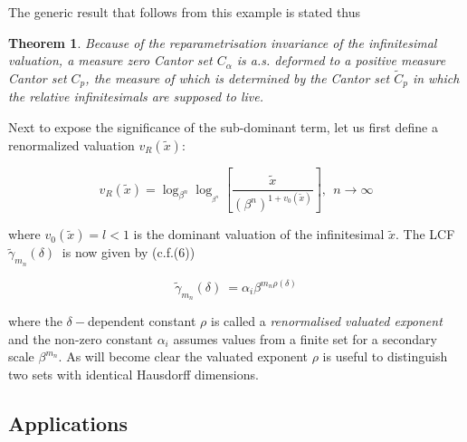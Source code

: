 \documentclass[12pt]{article}
\newtheorem{theorem}{Theorem}
\begin{document}
\vspace{.25cm}

The generic result that follows from this example is stated thus

\begin{theorem}
Because of the reparametrisation invariance of the infinitesimal valuation, a measure zero Cantor set $C_{\alpha}$ is a.s. deformed to a positive measure Cantor set $C_p$, the measure of which is determined by the Cantor set $\tilde C_p$ in which the relative infinitesimals are supposed to live. 
\end{theorem}

Next to expose the significance of the sub-dominant term, let us first define a
renormalized valuation $v_R(\tilde x)$:

\begin{equation}\label{eq32}
v_{R}\left( \tilde{x}\right) =\log _{\beta ^{n}}\log _{_{\beta ^{n}}}\left[ 
\frac{\tilde{x}}{\left( {\beta ^{n}}\right) ^{1+v_{0}\left( \tilde{x}%
\right) }}\right], \ \ n\rightarrow \infty
\end{equation}

\noindent where $v_{0}\left( \tilde{x}\right) =l<1$ is the dominant valuation of the
infinitesimal $\tilde{x}.$ The LCF $\tilde{\gamma}_{m_{n}}(\delta )\ $ is now given by (c.f.(6))

\begin{equation}\label{eq33}
\tilde{\gamma}_{m_{n}}(\delta )\ =\alpha _{i}\beta ^{m_{n}\rho \left( \delta
\right) }
\end{equation}

\noindent where the $\delta -$dependent constant $\rho $ is called a {\em renormalised valuated exponent} and the non-zero constant $\alpha _{i}$ assumes values from a finite
set for a secondary scale $\beta^{m_n}$. As will become clear the valuated exponent $\rho $ is useful to distinguish two sets with identical Hausdorff dimensions.

\vspace{.25cm}



\subsection{Applications}
\end{document}
